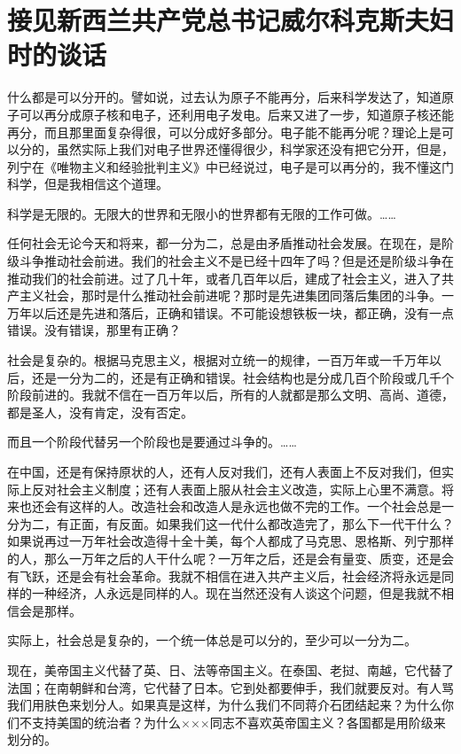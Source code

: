\section[接见新西兰共产党总书记威尔科克斯夫妇时的谈话（一九六四年二月九日）]{接见新西兰共产党总书记威尔科克斯夫妇时的谈话}


什么都是可以分开的。譬如说，过去认为原子不能再分，后来科学发达了，知道原子可以再分成原子核和电子，还利用电子发电。后来又进了一步，知道原子核还能再分，而且那里面复杂得很，可以分成好多部分。电子能不能再分呢？理论上是可以分的，虽然实际上我们对电子世界还懂得很少，科学家还没有把它分开，但是，列宁在《唯物主义和经验批判主义》中已经说过，电子是可以再分的，我不懂这门科学，但是我相信这个道理。

科学是无限的。无限大的世界和无限小的世界都有无限的工作可做。……

任何社会无论今天和将来，都一分为二，总是由矛盾推动社会发展。在现在，是阶级斗争推动社会前进。我们的社会主义不是已经十四年了吗？但是还是阶级斗争在推动我们的社会前进。过了几十年，或者几百年以后，建成了社会主义，进入了共产主义社会，那时是什么推动社会前进呢？那时是先进集团同落后集团的斗争。一万年以后还是先进和落后，正确和错误。不可能设想铁板一块，都正确，没有一点错误。没有错误，那里有正确？

社会是复杂的。根据马克思主义，根据对立统一的规律，一百万年或一千万年以后，还是一分为二的，还是有正确和错误。社会结构也是分成几百个阶段或几千个阶段前进的。我就不信在一百万年以后，所有的人就都是那么文明、高尚、道德，都是圣人，没有肯定，没有否定。

而且一个阶段代替另一个阶段也是要通过斗争的。……

在中国，还是有保持原状的人，还有人反对我们，还有人表面上不反对我们，但实际上反对社会主义制度；还有人表面上服从社会主义改造，实际上心里不满意。将来也还会有这样的人。改造社会和改造人是永远也做不完的工作。一个社会总是一分为二，有正面，有反面。如果我们这一代什么都改造完了，那么下一代干什么？如果说再过一万年社会改造得十全十美，每个人都成了马克思、恩格斯、列宁那样的人，那么一万年之后的人干什么呢？一万年之后，还是会有量变、质变，还是会有飞跃，还是会有社会革命。我就不相信在进入共产主义后，社会经济将永远是同样的一种经济，人永远是同样的人。现在当然还没有人谈这个问题，但是我就不相信会是那样。

实际上，社会总是复杂的，一个统一体总是可以分的，至少可以一分为二。

现在，美帝国主义代替了英、日、法等帝国主义。在泰国、老挝、南越，它代替了法国；在南朝鲜和台湾，它代替了日本。它到处都要伸手，我们就要反对。有人骂我们用肤色来划分人。如果真是这样，为什么我们不同蒋介石团结起来？为什么你们不支持美国的统治者？为什么×××同志不喜欢英帝国主义？各国都是用阶级来划分的。

